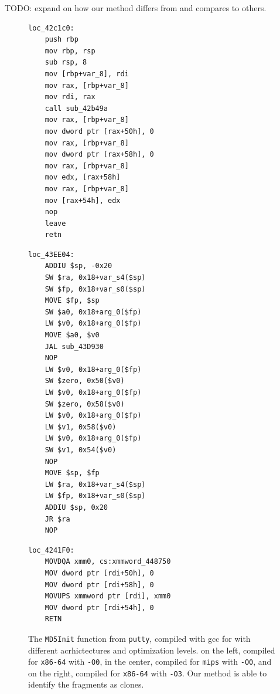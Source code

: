 \documentclass[conference,compsoc]{IEEEtran}
\begin{document}
TODO: expand on how our method differs from and compares to others.

\begin{figure}[!t]
\centering
\begin{minipage}[t]{0.32\linewidth}
\centering
\begin{verbatim}
loc_42c1c0:
    push rbp
    mov rbp, rsp
    sub rsp, 8
    mov [rbp+var_8], rdi
    mov rax, [rbp+var_8]
    mov rdi, rax
    call sub_42b49a
    mov rax, [rbp+var_8]
    mov dword ptr [rax+50h], 0
    mov rax, [rbp+var_8]
    mov dword ptr [rax+58h], 0
    mov rax, [rbp+var_8]
    mov edx, [rax+58h]
    mov rax, [rbp+var_8]
    mov [rax+54h], edx
    nop 
    leave 
    retn 
\end{verbatim}
\end{minipage}
\hfill
\begin{minipage}[t]{0.32\linewidth}
\centering
\begin{verbatim}
loc_43EE04:
    ADDIU $sp, -0x20
    SW $ra, 0x18+var_s4($sp)
    SW $fp, 0x18+var_s0($sp)
    MOVE $fp, $sp
    SW $a0, 0x18+arg_0($fp)
    LW $v0, 0x18+arg_0($fp)
    MOVE $a0, $v0
    JAL sub_43D930
    NOP 
    LW $v0, 0x18+arg_0($fp)
    SW $zero, 0x50($v0)
    LW $v0, 0x18+arg_0($fp)
    SW $zero, 0x58($v0)
    LW $v0, 0x18+arg_0($fp)
    LW $v1, 0x58($v0)
    LW $v0, 0x18+arg_0($fp)
    SW $v1, 0x54($v0)
    NOP 
    MOVE $sp, $fp
    LW $ra, 0x18+var_s4($sp)
    LW $fp, 0x18+var_s0($sp)
    ADDIU $sp, 0x20
    JR $ra
    NOP 
\end{verbatim}
\end{minipage}
\begin{minipage}[t]{0.32\linewidth}
\centering
\begin{verbatim}
loc_4241F0:
    MOVDQA xmm0, cs:xmmword_448750
    MOV dword ptr [rdi+50h], 0
    MOV dword ptr [rdi+58h], 0
    MOVUPS xmmword ptr [rdi], xmm0
    MOV dword ptr [rdi+54h], 0
    RETN
\end{verbatim}
\end{minipage}
\caption{The \texttt{MD5Init} function from \texttt{putty}, compiled with gcc for with different acrhictectures and optimization levels.
    on the left, compiled for \texttt{x86-64} with \texttt{-O0}, in the center, compiled for \texttt{mips} with \texttt{-O0}, and on the right,
    compiled for \texttt{x86-64} with \texttt{-O3}.  Our method is able to identify the fragments as clones.}
\label{asm-diff}
\end{figure}
\end{document}
